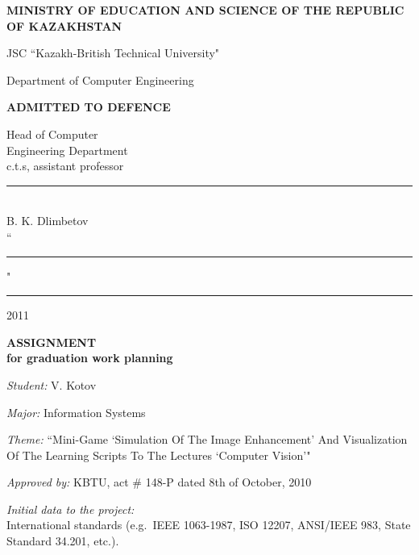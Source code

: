 \documentclass[12pt]{article}
\begin{document}
	\begin{center}
		{\bf{\MakeUppercase{Ministry of education and science of the republic of Kazakhstan}}

		\vspace{12pt}

		JSC ``Kazakh-British Technical University"

		Department of Computer Engineering}

		\begin{flushright}
			{\bf \MakeUppercase{Admitted to defence}}

			Head of Computer\\
			Engineering Department\\
			c.t.s, assistant professor\\
			\vspace{0.5\baselineskip}
			\rule{13em}{0.4pt}\\
			B. K. Dlimbetov\\
			\vspace{0.5\baselineskip}
			``\rule{2em}{0.4pt}" \rule{8em}{0.4pt} 2011\\
		\end{flushright}

		{\bf
		\MakeUppercase{Assignment}\\
		for graduation work planning}

		\vspace{12pt}

	\end{center}

	\setlength{\parindent}{0pt}
	\setlength{\parskip}{1ex plus 0.5ex minus 0.2ex}

	\emph{Student:} V. Kotov

	\emph{Major:} Information Systems

	\emph{Theme:} ``Mini-Game `Simulation Of The Image Enhancement' And Visualization Of The Learning Scripts To The Lectures `Computer Vision'"

	\emph{Approved by:} KBTU, act \# 148-P dated 8th of October, 2010

	\emph{Initial data to the project:}\\
	International standards (e.g.\ IEEE 1063-1987, ISO 12207, ANSI/IEEE 983, State Standard 34.201, etc.).
\end{document}
